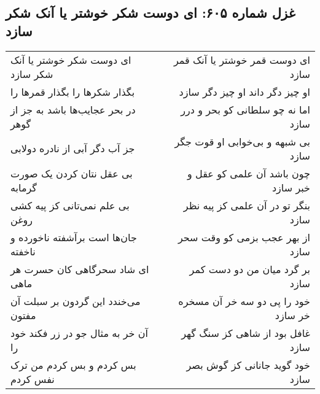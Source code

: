 \begin{center}
\section*{غزل شماره ۶۰۵: ای دوست شکر خوشتر یا آنک شکر سازد}
\label{sec:0605}
\begin{longtable}{l p{0.5cm} r}
ای دوست شکر خوشتر یا آنک شکر سازد
&&
ای دوست قمر خوشتر یا آنک قمر سازد
\\
بگذار شکرها را بگذار قمرها را
&&
او چیز دگر داند او چیز دگر سازد
\\
در بحر عجایب‌ها باشد به جز از گوهر
&&
اما نه چو سلطانی کو بحر و درر سازد
\\
جز آب دگر آبی از نادره دولابی
&&
بی شبهه و بی‌خوابی او قوت جگر سازد
\\
بی عقل نتان کردن یک صورت گرمابه
&&
چون باشد آن علمی کو عقل و خبر سازد
\\
بی علم نمی‌تانی کز پیه کشی روغن
&&
بنگر تو در آن علمی کز پیه نظر سازد
\\
جان‌ها است برآشفته ناخورده و ناخفته
&&
از بهر عجب بزمی کو وقت سحر سازد
\\
ای شاد سحرگاهی کان حسرت هر ماهی
&&
بر گرد میان من دو دست کمر سازد
\\
می‌خندد این گردون بر سبلت آن مفتون
&&
خود را پی دو سه خر آن مسخره خر سازد
\\
آن خر به مثال جو در زر فکند خود را
&&
غافل بود از شاهی کز سنگ گهر سازد
\\
بس کردم و بس کردم من ترک نفس کردم
&&
خود گوید جانانی کز گوش بصر سازد
\\
\end{longtable}
\end{center}
